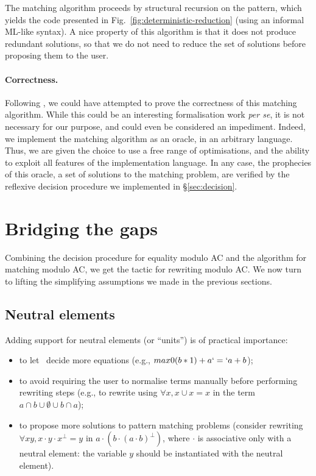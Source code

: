 \documentclass{llncs}
\begin{document}
The matching algorithm proceeds by structural recursion on the
pattern, which yields the code presented in
Fig.~\ref{fig:deterministic-reduction} (using an informal ML-like
syntax). A nice property of this algorithm is that it does not produce
redundant solutions, so that we do not need to reduce the set of
solutions before proposing them to the user.

\paragraph{Correctness.} 

Following \cite{contejean-04}, we could have attempted to prove the
correctness of this matching algorithm. While this could be an
interesting formalisation work \emph{per se}, it is not necessary for
our purpose, and could even be considered an impediment. Indeed, we
implement the matching algorithm as an oracle, in an arbitrary
language.
Thus, we are given the choice to use a free range of optimisations,
and the ability to exploit all features of the implementation language.
In any case, the prophecies of this oracle, a set of solutions to the
matching problem, are verified by the reflexive decision procedure we
implemented in \S\ref{sec:decision}.


\section{Bridging the gaps}
\label{sec:extend}

Combining the decision procedure for equality modulo AC and the
algorithm for matching modulo AC, we get the tactic for rewriting
modulo AC. We now turn to lifting the simplifying assumptions we made
in the previous sections.

\subsection{Neutral elements}
\label{ssec:units}

Adding support for neutral elements (or ``units'') is of practical
importance:
\vspace{-.5em}
\begin{itemize}
\item to let \tac\ decide more equations (e.g.,
  \coqinline$max 0 (b*1)+a`=`a+b$);
\item to avoid requiring the user to
  normalise terms manually before performing rewriting steps (e.g., to
  rewrite using $\forall x,x\cup x=x$ in the term $a\cap
  b\cup\emptyset\cup b\cap a$);
\item to propose more solutions to
  pattern matching problems (consider rewriting $\forall x y,x\cdot
  y\cdot x^\perp=y$ in $a\cdot (b\cdot (a\cdot b)^\perp)$, where
  $\cdot$ is associative only with a neutral element: the variable $y$
  should be instantiated with the neutral element).
\end{itemize}
\end{document}
